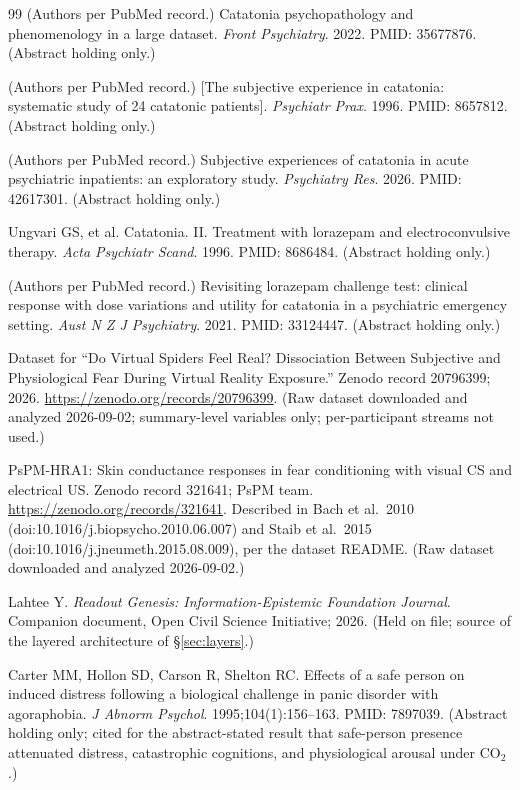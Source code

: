 \documentclass[9pt,twocolumn]{article}
\begin{document}
\begin{thebibliography}{99}
(Authors per PubMed record.) Catatonia psychopathology and phenomenology in a large dataset. \emph{Front Psychiatry}. 2022. PMID: 35677876. (Abstract holding only.)

(Authors per PubMed record.) [The subjective experience in catatonia: systematic study of 24 catatonic patients]. \emph{Psychiatr Prax}. 1996. PMID: 8657812. (Abstract holding only.)

(Authors per PubMed record.) Subjective experiences of catatonia in acute psychiatric inpatients: an exploratory study. \emph{Psychiatry Res}. 2026. PMID: 42617301. (Abstract holding only.)

Ungvari GS, et al. Catatonia. II. Treatment with lorazepam and electroconvulsive therapy. \emph{Acta Psychiatr Scand}. 1996. PMID: 8686484. (Abstract holding only.)

(Authors per PubMed record.) Revisiting lorazepam challenge test: clinical response with dose variations and utility for catatonia in a psychiatric emergency setting. \emph{Aust N Z J Psychiatry}. 2021. PMID: 33124447. (Abstract holding only.)

Dataset for ``Do Virtual Spiders Feel Real? Dissociation Between Subjective and Physiological Fear During Virtual Reality Exposure.'' Zenodo record 20796399; 2026. \url{https://zenodo.org/records/20796399}. (Raw dataset downloaded and analyzed 2026-09-02; summary-level variables only; per-participant streams not used.)

PsPM-HRA1: Skin conductance responses in fear conditioning with visual CS and electrical US. Zenodo record 321641; PsPM team. \url{https://zenodo.org/records/321641}. Described in Bach et al.\ 2010 (doi:10.1016/j.biopsycho.2010.06.007) and Staib et al.\ 2015 (doi:10.1016/j.jneumeth.2015.08.009), per the dataset README. (Raw dataset downloaded and analyzed 2026-09-02.)

Lahtee Y. \emph{Readout Genesis: Information-Epistemic Foundation Journal}. Companion document, Open Civil Science Initiative; 2026. (Held on file; source of the layered architecture of \S\ref{sec:layers}.)

Carter MM, Hollon SD, Carson R, Shelton RC. Effects of a safe person on induced distress following a biological challenge in panic disorder with agoraphobia. \emph{J Abnorm Psychol}. 1995;104(1):156--163. PMID: 7897039. (Abstract holding only; cited for the abstract-stated result that safe-person presence attenuated distress, catastrophic cognitions, and physiological arousal under CO$_2$.)


\end{thebibliography}
\end{document}
